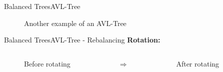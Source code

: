 
\begin{frame}{Balanced Trees}{AVL-Tree}
  \begin{figure}
    \begin{adjustbox}{width=0.75\linewidth}
      
    \end{adjustbox}
    \caption{Another example of an AVL-Tree}
    \label{fig:balanced_trees:avl_tree_example3}
  \end{figure}
\end{frame}


\begin{frame}{Balanced Trees}{AVL-Tree - Rebalancing}
  \textbf{Rotation:}
     \vspace{-2.5em}
   \begin{columns}
    \begin{column}{0.35\linewidth}
      \begin{figure}
        \begin{adjustbox}{width=\linewidth}
          
        \end{adjustbox}
        \vspace{-2.0em}
        \caption{Before rotating}
        \label{fig:balanced_trees:avl_tree_rotate_1}
      \end{figure}
    \end{column}
    \begin{column}{0.1\linewidth}
      \begin{center}
        $\Rightarrow$
      \end{center}
    \end{column}
    \begin{column}{0.35\linewidth}
      \begin{figure}
        \begin{adjustbox}{width=\linewidth}
          
        \end{adjustbox}
        \vspace{-2.0em}
        \caption{After rotating}
        \label{fig:balanced_trees:avl_tree_rotate_2}
      \end{figure}
    \end{column}
   \end{columns}
  \begin{itemize}

\end{itemize}
\end{frame}
